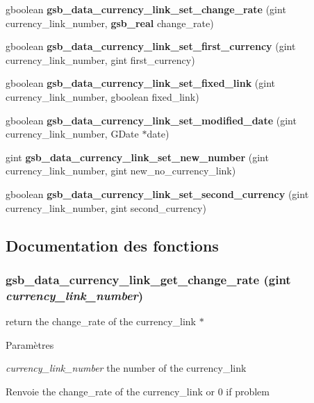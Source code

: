 \begin{DoxyCompactItemize}
\item 
gboolean {\bf gsb\_\-data\_\-currency\_\-link\_\-set\_\-change\_\-rate} (gint currency\_\-link\_\-number, {\bf gsb\_\-real} change\_\-rate)
\item 
gboolean {\bf gsb\_\-data\_\-currency\_\-link\_\-set\_\-first\_\-currency} (gint currency\_\-link\_\-number, gint first\_\-currency)
\item 
gboolean {\bf gsb\_\-data\_\-currency\_\-link\_\-set\_\-fixed\_\-link} (gint currency\_\-link\_\-number, gboolean fixed\_\-link)
\item 
gboolean {\bf gsb\_\-data\_\-currency\_\-link\_\-set\_\-modified\_\-date} (gint currency\_\-link\_\-number, GDate $\ast$date)
\item 
gint {\bf gsb\_\-data\_\-currency\_\-link\_\-set\_\-new\_\-number} (gint currency\_\-link\_\-number, gint new\_\-no\_\-currency\_\-link)
\item 
gboolean {\bf gsb\_\-data\_\-currency\_\-link\_\-set\_\-second\_\-currency} (gint currency\_\-link\_\-number, gint second\_\-currency)
\end{DoxyCompactItemize}


\subsection{Documentation des fonctions}
\subsubsection[{gsb\_\-data\_\-currency\_\-link\_\-get\_\-change\_\-rate}]{ gsb\_\-data\_\-currency\_\-link\_\-get\_\-change\_\-rate (gint {\em currency\_\-link\_\-number})}\label{gsb__data__currency__link_8h_aa18864d68d7555d3b39e14ef87beeb7d}
return the change\_\-rate of the currency\_\-link $\ast$ 
\begin{DoxyParams}{Paramètres}
\item[{\em currency\_\-link\_\-number}]the number of the currency\_\-link\end{DoxyParams}
\begin{DoxyReturn}{Renvoie}
the change\_\-rate of the currency\_\-link or 0 if problem 
\end{DoxyReturn}



